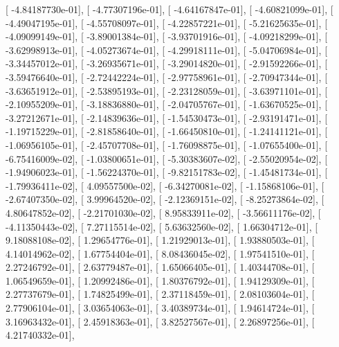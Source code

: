 \documentclass{article}
\begin{document}
       [ -4.84187730e-01],
       [ -4.77307196e-01],
       [ -4.64167847e-01],
       [ -4.60821099e-01],
       [ -4.49047195e-01],
       [ -4.55708097e-01],
       [ -4.22857221e-01],
       [ -5.21625635e-01],
       [ -4.09099149e-01],
       [ -3.89001384e-01],
       [ -3.93701916e-01],
       [ -4.09218299e-01],
       [ -3.62998913e-01],
       [ -4.05273674e-01],
       [ -4.29918111e-01],
       [ -5.04706984e-01],
       [ -3.34457012e-01],
       [ -3.26935671e-01],
       [ -3.29014820e-01],
       [ -2.91592266e-01],
       [ -3.59476640e-01],
       [ -2.72442224e-01],
       [ -2.97758961e-01],
       [ -2.70947344e-01],
       [ -3.63651912e-01],
       [ -2.53895193e-01],
       [ -2.23128059e-01],
       [ -3.63971101e-01],
       [ -2.10955209e-01],
       [ -3.18836880e-01],
       [ -2.04705767e-01],
       [ -1.63670525e-01],
       [ -3.27212671e-01],
       [ -2.14839636e-01],
       [ -1.54530473e-01],
       [ -2.93191471e-01],
       [ -1.19715229e-01],
       [ -2.81858640e-01],
       [ -1.66450810e-01],
       [ -1.24141121e-01],
       [ -1.06956105e-01],
       [ -2.45707708e-01],
       [ -1.76098875e-01],
       [ -1.07655400e-01],
       [ -6.75416009e-02],
       [ -1.03800651e-01],
       [ -5.30383607e-02],
       [ -2.55020954e-02],
       [ -1.94906023e-01],
       [ -1.56224370e-01],
       [ -9.82151783e-02],
       [ -1.45481734e-01],
       [ -1.79936411e-02],
       [  4.09557500e-02],
       [ -6.34270081e-02],
       [ -1.15868106e-01],
       [ -2.67407350e-02],
       [  3.99964520e-02],
       [ -2.12369151e-02],
       [ -8.25273864e-02],
       [  4.80647852e-02],
       [ -2.21701030e-02],
       [  8.95833911e-02],
       [ -3.56611176e-02],
       [ -4.11350443e-02],
       [  7.27115514e-02],
       [  5.63632560e-02],
       [  1.66304712e-01],
       [  9.18088108e-02],
       [  1.29654776e-01],
       [  1.21929013e-01],
       [  1.93880503e-01],
       [  4.14014962e-02],
       [  1.67754404e-01],
       [  8.08436045e-02],
       [  1.97541510e-01],
       [  2.27246792e-01],
       [  2.63779487e-01],
       [  1.65066405e-01],
       [  1.40344708e-01],
       [  1.06549659e-01],
       [  1.20992486e-01],
       [  1.80376792e-01],
       [  1.94129309e-01],
       [  2.27737679e-01],
       [  1.74825499e-01],
       [  2.37118459e-01],
       [  2.08103604e-01],
       [  2.77906104e-01],
       [  3.03654063e-01],
       [  3.40389734e-01],
       [  1.94614724e-01],
       [  3.16963432e-01],
       [  2.45918363e-01],
       [  3.82527567e-01],
       [  2.26897256e-01],
       [  4.21740332e-01],
\end{document}
